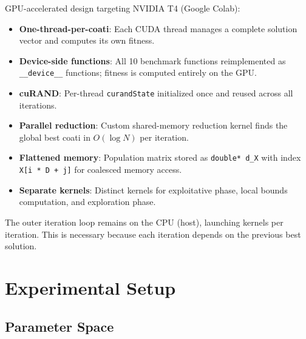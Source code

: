 \documentclass[12pt, a4paper]{article}
\begin{document}
GPU-accelerated design targeting NVIDIA T4 (Google Colab):
\begin{itemize}
    \item \textbf{One-thread-per-coati}: Each CUDA thread manages a complete solution vector and computes its own fitness.
    \item \textbf{Device-side functions}: All 10 benchmark functions reimplemented as \texttt{\_\_device\_\_} functions; fitness is computed entirely on the GPU.
    \item \textbf{cuRAND}: Per-thread \texttt{curandState} initialized once and reused across all iterations.
    \item \textbf{Parallel reduction}: Custom shared-memory reduction kernel finds the global best coati in $O(\log N)$ per iteration.
    \item \textbf{Flattened memory}: Population matrix stored as \texttt{double* d\_X} with index \texttt{X[i * D + j]} for coalesced memory access.
    \item \textbf{Separate kernels}: Distinct kernels for exploitative phase, local bounds computation, and exploration phase.
\end{itemize}

The outer iteration loop remains on the CPU (host), launching kernels per iteration. This is necessary because each iteration depends on the previous best solution.

\section{Experimental Setup}

\subsection{Parameter Space}
\end{document}
